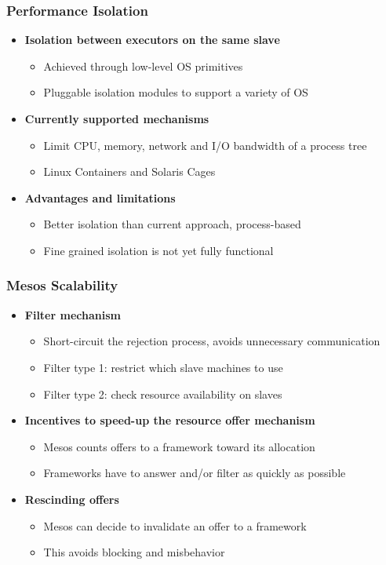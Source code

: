 \begin{frame}
\frametitle{Performance Isolation}
\begin{itemize}
	\item {\bf Isolation between executors on the same slave}
	\begin{itemize}
		\item Achieved through low-level OS primitives
		\item Pluggable isolation modules to support a variety of OS
	\end{itemize}
	\item {\bf Currently supported mechanisms}
	\begin{itemize}
		\item Limit CPU, memory, network and I/O bandwidth of a process tree
		\item Linux Containers and Solaris Cages
	\end{itemize}
	\item {\bf Advantages and limitations}
	\begin{itemize}
		\item Better isolation than current approach, process-based
		\item Fine grained isolation is not yet fully functional
	\end{itemize}
\end{itemize}
\end{frame}

\begin{frame}
\frametitle{Mesos Scalability}
\begin{itemize}
	\item {\bf Filter mechanism}
	\begin{itemize}
		\item Short-circuit the rejection process, avoids unnecessary communication
		\item Filter type 1: restrict which slave machines to use
		\item Filter type 2: check resource availability on slaves
	\end{itemize}
	\item {\bf Incentives to speed-up the resource offer mechanism}
	\begin{itemize}
		\item Mesos counts offers to a framework toward its allocation
		\item Frameworks have to answer and/or filter as quickly as possible
	\end{itemize}
	\item {\bf Rescinding offers}
	\begin{itemize}
		\item Mesos can decide to invalidate an offer to a framework
		\item This avoids blocking and misbehavior
	\end{itemize}
\end{itemize}
\end{frame}

